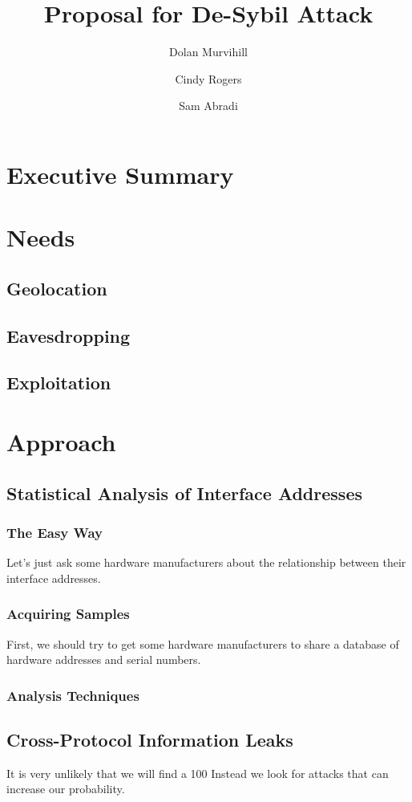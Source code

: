 \documentclass{article}
\author{Dolan Murvihill \and Cindy Rogers \and Sam Abradi}
\title{Proposal for De-Sybil Attack}
\begin{document}
	\maketitle
	\section{Executive Summary}
	\section{Needs}
		\subsection{Geolocation}
		\subsection{Eavesdropping}
		\subsection{Exploitation}
	\section{Approach}
		\subsection{Statistical Analysis of Interface Addresses}
			\subsubsection{The Easy Way}
				Let's just ask some hardware manufacturers about the
				relationship between their interface addresses.
			\subsubsection{Acquiring Samples}
				First, we should try to get some hardware manufacturers to 
				share a database of hardware addresses and serial numbers.
			\subsubsection{Analysis Techniques}
		\subsection{Cross-Protocol Information Leaks}
			It is very unlikely that we will find a 100%
			Instead we look for attacks that can increase our probability.
			
\end{document}
